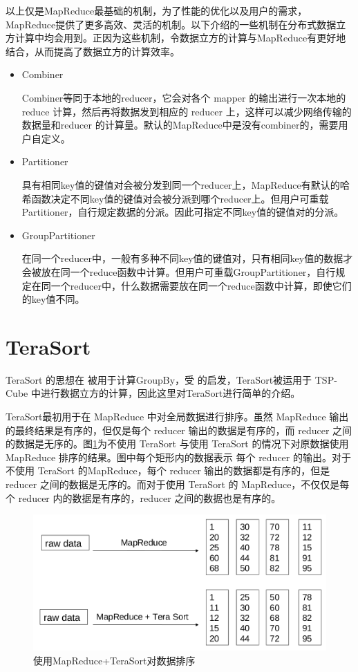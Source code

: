 以上仅是MapReduce最基础的机制，为了性能的优化以及用户的需求，MapReduce提供了更多高效、灵活的机制。以下介绍的一些机制在分布式数据立方计算中均会用到。正因为这些机制，令数据立方的计算与MapReduce有更好地结合，从而提高了数据立方的计算效率。

\begin{itemize}

\item Combiner

Combiner等同于本地的reducer，它会对各个 mapper 的输出进行一次本地的 reduce 计算，然后再将数据发到相应的 reducer 上，这样可以减少网络传输的数据量和reducer 的计算量。默认的MapReduce中是没有combiner的，需要用户自定义。

\item Partitioner

具有相同key值的键值对会被分发到同一个reducer上，MapReduce有默认的哈希函数决定不同key值的键值对会被分派到哪个reducer上。但用户可重载Partitioner，自行规定数据的分派。因此可指定不同key值的键值对的分派。

\item GroupPartitioner

在同一个reducer中，一般有多种不同key值的键值对，只有相同key值的数据才会被放在同一个reduce函数中计算。但用户可重载GroupPartitioner，自行规定在同一个reducer中，什么数据需要放在同一个reduce函数中计算，即使它们的key值不同。

\end{itemize}




\section{TeraSort}

TeraSort\cite{o2008terabyte} 的思想在\cite{o2008terabyte} 被用于计算GroupBy，受\cite{o2008terabyte} 的启发，TeraSort被运用于 TSP-Cube 中进行数据立方的计算，因此这里对TeraSort进行简单的介绍。

TeraSort最初用于在 MapReduce 中对全局数据进行排序。虽然 MapReduce 输出的最终结果是有序的，但仅是每个 reducer 输出的数据是有序的，而 reducer 之间的数据是无序的。图\ref{tera_sort}为不使用 TeraSort 与使用 TeraSort 的情况下对原数据使用 MapReduce 排序的结果。图中每个矩形内的数据表示 每个 reducer 的输出。对于不使用 TeraSort 的MapReduce，每个 reducer 输出的数据都是有序的，但是reducer 之间的数据是无序的。而对于使用 TeraSort 的 MapReduce，不仅仅是每个 reducer 内的数据是有序的，reducer 之间的数据也是有序的。

\begin{figure}[ht] 
\centering\includegraphics[width=4.5in]{picture/ch_terasort_mr/tera_sort} 
\caption{使用MapReduce+TeraSort对数据排序}\label{tera_sort} 
\end{figure}

